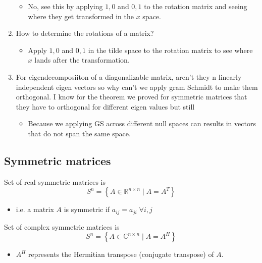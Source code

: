 \begin{summary}
\begin{enumerate}
        \begin{itemize}
            \item No, see this by applying $1,0$ and $0,1$ to the rotation matrix and seeing where they get transformed in the $x$ space. 
        \end{itemize}
        \item How to determine the rotations of a matrix?
        \begin{itemize}
            \item Apply $1,0$ and $0,1$ in the tilde space to the rotation matrix to see where $x$ lands after the transformation.
        \end{itemize}
        \item For eigendecomposiiton of a diagonalizable matrix, aren’t they n linearly independent eigen vectors so why can’t we apply gram Schmidt to make them orthogonal. I know for the theorem we proved for symmetric matrices that they have to orthogonal for different eigen values but still
        \begin{itemize}
            \item Because we applying GS across different null spaces can results in vectors that do not span the same space. 
        \end{itemize}
    \end{enumerate}
\end{summary}

\subsection{Symmetric matrices}
\begin{definition}
    Set of real symmetric matrices is 
    \[
    S^n = \left\{ A \in \mathbb{R}^{n \times n} \mid A = A^T \right\}
    \]
    \begin{itemize}
        \item i.e. a matrix $A$ is symmetric if $a_{ij} = a_{ji} \; \forall i,j$
    \end{itemize}
    \vspace{1em}

    Set of complex symmetric matrices is
    \[
    S^n = \left\{ A \in \mathbb{C}^{n \times n} \mid A = A^H \right\}
    \]
    \begin{itemize}
        \item $A^H$ represents the Hermitian transpose (conjugate transpose) of $A$.
    \end{itemize}
    
\end{definition}

